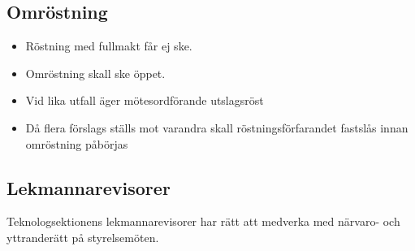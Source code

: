 \subsection{Omröstning} 

\begin{itemize}
  \item Röstning med fullmakt får ej ske. 
  \item Omröstning skall ske öppet. 
  \item Vid lika utfall äger mötesordförande utslagsröst
  \item Då flera förslags ställs mot varandra skall röstningsförfarandet fastslås innan omröstning påbörjas
\end{itemize}

\subsection{Lekmannarevisorer}
Teknologsektionens lekmannarevisorer har rätt att medverka med närvaro-
och yttranderätt på styrelsemöten.
\newpage

